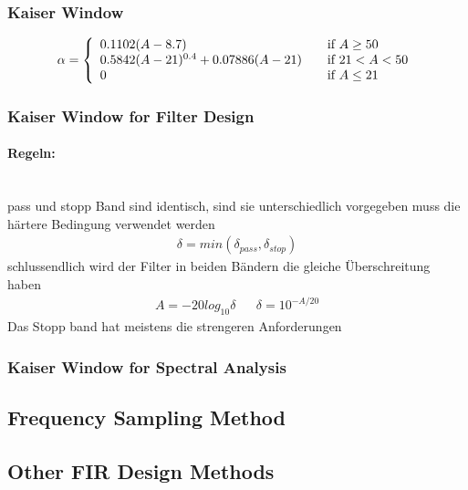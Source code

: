 \subsubsection{Kaiser Window}
\begin{align*}
	\alpha = \left\{
		\begin{array}{l l}
			0.1102(A-8.7)& \quad \text{if } A \geq 50\\
			0.5842(A-21)^{0.4}+0.07886(A-21) & \quad \text{if }21 < A < 50\\
			0 & \quad \text{if } A \leq 21
		\end{array} \right.
\end{align*}
\subsubsection{Kaiser Window for Filter Design}


\paragraph{Regeln:}~\\
pass und stopp Band sind identisch, sind sie unterschiedlich vorgegeben muss die härtere Bedingung verwendet werden \\
\begin{align*}
\delta=min(\delta_{pass},\delta_{stop})
\end{align*}
schlussendlich wird der Filter in beiden Bändern die gleiche Überschreitung haben
\begin{align*}
A=-20log_{10}\delta && \delta=10^{-A/20}
\end{align*}
Das Stopp band hat meistens die strengeren Anforderungen
\subsubsection{Kaiser Window for Spectral Analysis}

\subsection{Frequency Sampling Method}

\subsection{Other FIR Design Methods}

